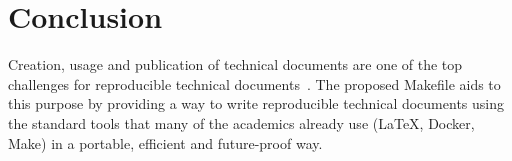 \documentclass[journal]{IEEEtran}
\begin{document}
\section*{Conclusion}
Creation, usage and publication of technical documents are one of the top challenges for reproducible technical documents~\cite{barba2019praxis}.
The proposed Makefile aids to this purpose by providing a way to write reproducible technical documents using the standard tools that many of the academics already use (\LaTeX, Docker, Make) in a portable, efficient and future-proof way.



\end{document}
